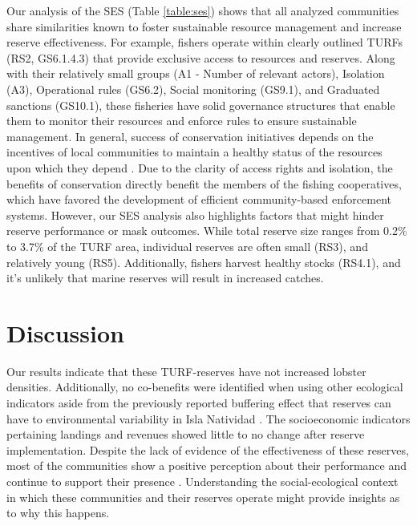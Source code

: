 \documentclass{frontiersSCNS}
\begin{document}
Our analysis of the SES (Table \ref{table:ses}) shows that all analyzed
communities share similarities known to foster sustainable resource
management and increase reserve effectiveness. For example, fishers
operate within clearly outlined TURFs (RS2, GS6.1.4.3) that provide
exclusive access to resources and reserves. Along with their relatively
small groups (A1 - Number of relevant actors), Isolation (A3),
Operational rules (GS6.2), Social monitoring (GS9.1), and Graduated
sanctions (GS10.1), these fisheries have solid governance structures
that enable them to monitor their resources and enforce rules to ensure
sustainable management. In general, success of conservation initiatives
depends on the incentives of local communities to maintain a healthy
status of the resources upon which they depend \citep{jupiter_2017}. Due
to the clarity of access rights and isolation, the benefits of
conservation directly benefit the members of the fishing cooperatives,
which have favored the development of efficient community-based
enforcement systems. However, our SES analysis also highlights factors
that might hinder reserve performance or mask outcomes. While total
reserve size ranges from 0.2\% to 3.7\% of the TURF area, individual
reserves are often small (RS3), and relatively young (RS5).
Additionally, fishers harvest healthy stocks (RS4.1), and it's unlikely
that marine reserves will result in increased catches.

\hypertarget{discussion}{%
\section{Discussion}\label{discussion}}

Our results indicate that these TURF-reserves have not increased lobster
densities. Additionally, no co-benefits were identified when using other
ecological indicators aside from the previously reported buffering
effect that reserves can have to environmental variability in Isla
Natividad \citep{micheli_2012-EU}. The socioeconomic indicators
pertaining landings and revenues showed little to no change after
reserve implementation. Despite the lack of evidence of the
effectiveness of these reserves, most of the communities show a positive
perception about their performance and continue to support their
presence \citep{ayer_2018}. Understanding the social-ecological context
in which these communities and their reserves operate might provide
insights as to why this happens.
\end{document}
